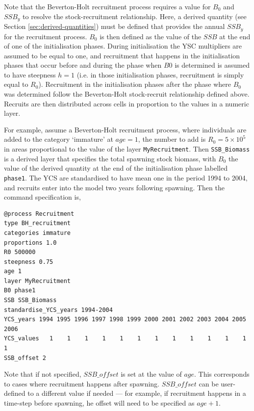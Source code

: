 Note that the Beverton-Holt recruitment process requires a value for $B_0$ and $SSB_y$ to resolve the stock-recruitment relationship. Here, a derived quantity (see Section \ref{sec:derived-quantities}) must be defined that provides the annual $SSB_y$ for the recruitment process. $B_0$ is then defined as the value of the $SSB$ at the end of one of the initialisation phases. During initialisation the YSC multipliers are assumed to be equal to one, and recruitment that happens in the initialisation phases that occur before and during the phase when $B0$ is determined is assumed to have steepness $h=1$ (i.e. in those initialisation phases, recruitment is simply equal to $R_0$). Recruitment in the initialisation phases after the phase where $B_0$ was determined follow the Beverton-Holt stock-recruit relationship defined above. Recruits are then distributed across cells in proportion to the values in a numeric layer. 

For example, assume a Beverton-Holt recruitment process, where individuals are added to the category `immature' at $age=1$, the number to add is $R_0=5 \times 10^5$ in areas proportional to the value of the layer \texttt{MyRecruitment}. Then \texttt{SSB\_Biomass} is a derived layer that specifies the total spawning stock biomass, with $B_0$ the value of the derived quantity at the end of the initialisation phase labelled \texttt{phase1}. The YCS are standardised to have mean one in the period 1994 to 2004, and recruits enter into the model two years following spawning. Then the command specification is,

{\small{\begin{verbatim}
@process Recruitment
type BH_recruitment
categories immature
proportions 1.0
R0 500000
steepness 0.75
age 1
layer MyRecruitment
B0 phase1
SSB SSB_Biomass
standardise_YCS_years 1994-2004
YCS_years 1994 1995 1996 1997 1998 1999 2000 2001 2002 2003 2004 2005 2006
YCS_values   1    1    1    1    1    1    1    1    1    1    1    1    1
SSB_offset 2
\end{verbatim}}}

Note that if not specified, $SSB\_offset$ is set at the value of $age$. This corresponds to cases where recruitment happens after spawning. $SSB\_offset$ can be user-defined to a different value if needed --- for example, if recruitment happens in a time-step before spawning, he offset will need to be specified as $age + 1$.

\subsubsection*{}

